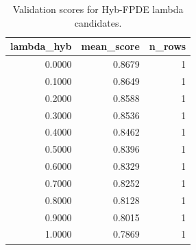 \begin{table}[t]
\caption{Validation scores for Hyb-FPDE lambda candidates.}
\label{tab:lambda_distribution_computed}
\centering
\begin{tabular}{rrr}
\toprule
lambda\_hyb & mean\_score & n\_rows \\
\midrule
0.0000 & 0.8679 & 1 \\
0.1000 & 0.8649 & 1 \\
0.2000 & 0.8588 & 1 \\
0.3000 & 0.8536 & 1 \\
0.4000 & 0.8462 & 1 \\
0.5000 & 0.8396 & 1 \\
0.6000 & 0.8329 & 1 \\
0.7000 & 0.8252 & 1 \\
0.8000 & 0.8128 & 1 \\
0.9000 & 0.8015 & 1 \\
1.0000 & 0.7869 & 1 \\
\bottomrule
\end{tabular}

\end{table}
